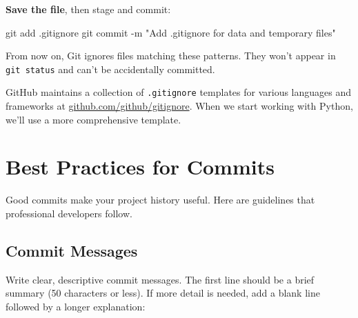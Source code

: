 \documentclass[
  letterpaper,
  DIV=11,
  numbers=noendperiod]{scrreprt}
\newenvironment{Shaded}{\begin{snugshade}}{\end{snugshade}}
\newcommand{\AttributeTok}[1]{\textcolor[rgb]{0.40,0.45,0.13}{#1}}
\newcommand{\FunctionTok}[1]{\textcolor[rgb]{0.28,0.35,0.67}{#1}}
\newcommand{\NormalTok}[1]{\textcolor[rgb]{0.00,0.23,0.31}{#1}}
\newcommand{\StringTok}[1]{\textcolor[rgb]{0.13,0.47,0.30}{#1}}
\begin{document}
\textbf{Save the file}, then stage and commit:

\begin{codelisting}

\caption{\texttt{terminal}}

\begin{Shaded}
\begin{Highlighting}[]
\FunctionTok{git}\NormalTok{ add .gitignore}
\FunctionTok{git}\NormalTok{ commit }\AttributeTok{{-}m} \StringTok{"Add .gitignore for data and temporary files"}
\end{Highlighting}
\end{Shaded}

\end{codelisting}

From now on, Git ignores files matching these patterns. They won't
appear in \texttt{git\ status} and can't be accidentally committed.

\begin{tcolorbox}[enhanced jigsaw, opacitybacktitle=0.6, arc=.35mm, colback=white, bottomtitle=1mm, opacityback=0, toprule=.15mm, left=2mm, colbacktitle=quarto-callout-tip-color!10!white, breakable, coltitle=black, toptitle=1mm, colframe=quarto-callout-tip-color-frame, bottomrule=.15mm, titlerule=0mm, title=\textcolor{quarto-callout-tip-color}{\faLightbulb}\hspace{0.5em}{Finding .gitignore Templates}, rightrule=.15mm, leftrule=.75mm]

GitHub maintains a collection of \texttt{.gitignore} templates for
various languages and frameworks at
\href{https://github.com/github/gitignore}{github.com/github/gitignore}.
When we start working with Python, we'll use a more comprehensive
template.

\end{tcolorbox}

\section{Best Practices for Commits}\label{best-practices-for-commits}

Good commits make your project history useful. Here are guidelines that
professional developers follow.

\subsection{Commit Messages}\label{commit-messages}

Write clear, descriptive commit messages. The first line should be a
brief summary (50 characters or less). If more detail is needed, add a
blank line followed by a longer explanation:
\end{document}
